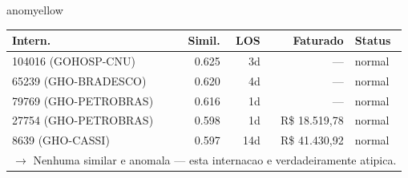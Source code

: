 \documentclass[a4paper,10pt]{article}
\begin{document}
\begin{anomalycard}[Internacao 118455 | GHO-BRADESCO | MODERADO (z=2.50)]{anomyellow}
\begin{tabular}{l r r r l}\toprule\textbf{Intern.} & \textbf{Simil.} & \textbf{LOS} & \textbf{Faturado} & \textbf{Status} \\\midrule
104016 (GOHOSP-CNU) & 0.625 & 3d & --- & \textcolor{jcubeblue}{normal} \\
65239 (GHO-BRADESCO) & 0.620 & 4d & --- & \textcolor{jcubeblue}{normal} \\
79769 (GHO-PETROBRAS) & 0.616 & 1d & --- & \textcolor{jcubeblue}{normal} \\
27754 (GHO-PETROBRAS) & 0.598 & 1d & R\$ 18.519,78 & \textcolor{jcubeblue}{normal} \\
8639 (GHO-CASSI) & 0.597 & 14d & R\$ 41.430,92 & \textcolor{jcubeblue}{normal} \\
\multicolumn{5}{l}{\textcolor{jcubeblue}{\small $\rightarrow$ Nenhuma similar e anomala --- esta internacao e verdadeiramente atipica.}} \\
\bottomrule\end{tabular}



\end{anomalycard}

\newpage
\end{document}
